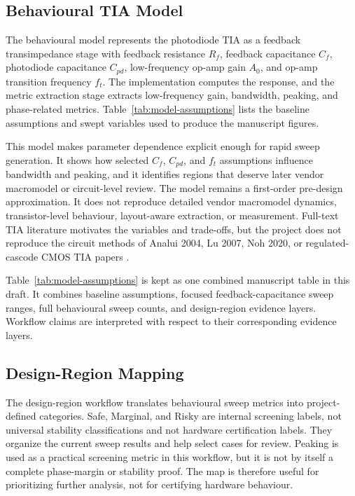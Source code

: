 \subsection{Behavioural TIA Model}

The behavioural model represents the photodiode TIA as a feedback transimpedance stage with feedback resistance $R_f$, feedback capacitance $C_f$, photodiode capacitance $C_{pd}$, low-frequency op-amp gain $A_0$, and op-amp transition frequency $f_t$. The implementation computes the response, and the metric extraction stage extracts low-frequency gain, bandwidth, peaking, and phase-related metrics. Table~\ref{tab:model-assumptions} lists the baseline assumptions and swept variables used to produce the manuscript figures.

This model makes parameter dependence explicit enough for rapid sweep generation. It shows how selected $C_f$, $C_{pd}$, and $f_t$ assumptions influence bandwidth and peaking, and it identifies regions that deserve later vendor macromodel or circuit-level review. The model remains a first-order pre-design approximation. It does not reproduce detailed vendor macromodel dynamics, transistor-level behaviour, layout-aware extraction, or measurement. Full-text TIA literature motivates the variables and trade-offs, but the project does not reproduce the circuit methods of Analui 2004, Lu 2007, Noh 2020, or regulated-cascode CMOS TIA papers \citep{ANALUI_2004_BW_ENHANCEMENT,LU_2007_BROADBAND_TIA,NOH_2020_CF_TIA_DC_LOOP,PARK_YOO_2004_RGC_TIA}.

Table~\ref{tab:model-assumptions} is kept as one combined manuscript table in this draft. It combines baseline assumptions, focused feedback-capacitance sweep ranges, full behavioural sweep counts, and design-region evidence layers. Workflow claims are interpreted with respect to their corresponding evidence layers.

\subsection{Design-Region Mapping}

The design-region workflow translates behavioural sweep metrics into project-defined categories. Safe, Marginal, and Risky are internal screening labels, not universal stability classifications and not hardware certification labels. They organize the current sweep results and help select cases for review. Peaking is used as a practical screening metric in this workflow, but it is not by itself a complete phase-margin or stability proof. The map is therefore useful for prioritizing further analysis, not for certifying hardware behaviour.

